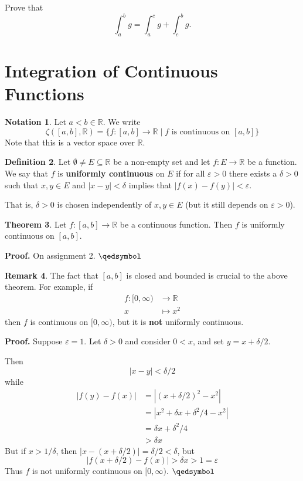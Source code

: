 \documentclass[11pt]{article}
\theoremstyle{definition}
\newtheorem{thm}{Theorem}[section]
\newtheorem{defn}[thm]{Definition}
\newtheorem{remark}[thm]{Remark}
\newtheorem{notation}[thm]{Notation}
\newcommand{\mbR}{\ensuremath{\mathbb{R}}}
\begin{document}
Prove that
$$\int_a^b g = \int_a^c g + \int_c^b g \text{.}$$

\newpage

\section{Integration of Continuous Functions}

\begin{notation}
Let $a<b \in \mbR$. We write
$$\zeta([a, b], \mbR) = \{f : [a, b] \to \mbR \mid f \text{ is continuous on } [a, b]\}$$
Note that this is a vector space over $\mbR$.
\end{notation}

\begin{defn}
Let $\emptyset \ne E \subseteq \mbR$ be a non-empty set and let $f : E \to \mbR$ be a function. We say that $f$ is \textbf{uniformly continuous} on $E$ if for all $\varepsilon > 0$ there exists a $\delta > 0$ such that $x, y \in E$ and $|x - y| < \delta$ implies that $|f(x) - f(y)| < \varepsilon$. 

That is, $\delta > 0$ is chosen independently of $x, y \in E$ (but it still depends on $\varepsilon > 0$).
\end{defn}

\begin{thm}
Let $f: [a, b] \to \mbR$ be a continuous function. Then $f$ is uniformly continuous on $[a, b]$.
\end{thm}
\textbf{Proof.} On assignment 2. $\qedsymbol$

\begin{remark}
The fact that $[a, b]$ is closed and bounded is crucial to the above theorem. 
For example, if
\begin{align*}
f : [0, \infty) & \to \mbR \\
x & \mapsto x^2 
\end{align*}
then $f$ is continuous on $[0, \infty)$, but it is \textbf{not} uniformly continuous. 

\textbf{Proof.} Suppose $\varepsilon = 1$. 
Let $\delta > 0$ and consider $0 < x$, and set $y = x + \delta / 2$. 

Then
$$|x - y| < \delta / 2$$
while
\begin{align*}
|f(y) - f(x)| & = |(x + \delta / 2)^2 - x^2| \\
& = |x^2 + \delta x + \delta^2 / 4 - x^2| \\
& = \delta x + \delta^2 / 4 \\
& > \delta x
\end{align*}
But if $x > 1/\delta$, then $|x - (x + \delta / 2)| = \delta / 2 < \delta$, but
$$|f(x + \delta / 2) - f(x)| > \delta x > 1 = \varepsilon$$
Thus $f$ is not uniformly continuous on $[0, \infty)$. $\qedsymbol$
\end{remark}
\end{document}
